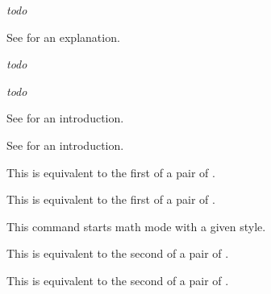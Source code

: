 \stopnewprimitive

\startnewprimitive[title={\prm {Uradical}}]

{\em todo} 

\stopnewprimitive

\startnewprimitive[title={\prm {Uright}}]

See  for an explanation.

\stopnewprimitive

\startnewprimitive[title={\prm {Uroot}}]

{\em todo} 

\stopnewprimitive

\startnewprimitive[title={\prm {Urooted}}]

{\em todo} 

\stopnewprimitive

\startnewprimitive[title={\prm {Uskewed}}]

See  for an introduction.

\stopnewprimitive

\startnewprimitive[title={\prm {Uskewedwithdelims}}]

See  for an introduction.

\stopnewprimitive

\startnewprimitive[title={\prm {Ustartdisplaymath}}]

This is equivalent to the first of a pair of \type {$$}.

\stopnewprimitive

\startnewprimitive[title={\prm {Ustartmath}}]

This is equivalent to the first of a pair of \type {$}.

\stopnewprimitive

\startnewprimitive[title={\prm {Ustartmathmode}}]

This command starts math mode with a given style.

\stopnewprimitive

\startnewprimitive[title={\prm {Ustopdisplaymath}}]

This is equivalent to the second of a pair of \type {$$}.

\stopnewprimitive

\startnewprimitive[title={\prm {Ustopmath}}]

This is equivalent to the second of a pair of \type {$}.

\stopnewprimitive

